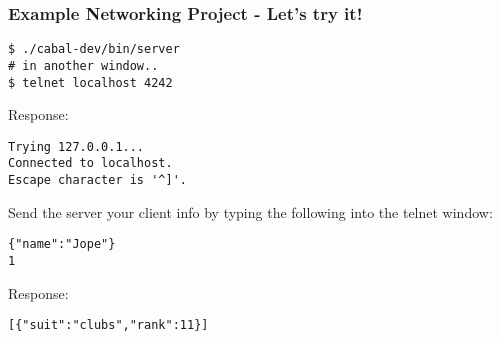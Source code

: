 \documentclass{beamer}
\begin{document}
\begin{frame}[fragile]
\frametitle{Example Networking Project - Let's try it!}

{\small
\begin{verbatim}
$ ./cabal-dev/bin/server
# in another window..
$ telnet localhost 4242
\end{verbatim}
}

Response:

{\small
\begin{verbatim}
Trying 127.0.0.1...
Connected to localhost.
Escape character is '^]'.
\end{verbatim}
}

Send the server your client info by typing the following into the telnet window:

{\small
\begin{verbatim}
{"name":"Jope"}
1
\end{verbatim}
}

Response:

{\small
\begin{verbatim}
[{"suit":"clubs","rank":11}]
\end{verbatim}
}

\end{frame}
\end{document}

